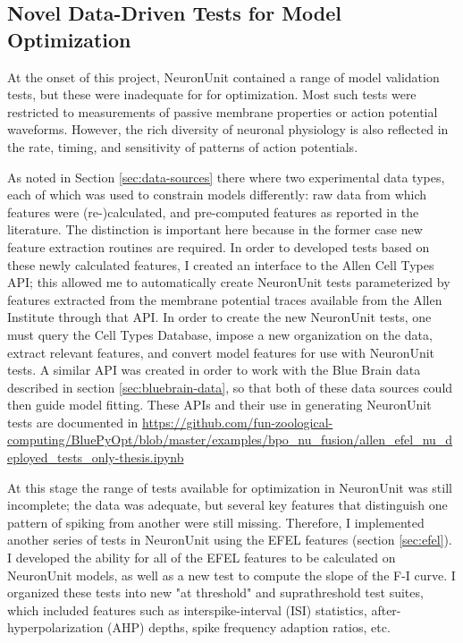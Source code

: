 \subsection{Novel Data-Driven Tests for Model Optimization}
At the onset of this project, NeuronUnit contained a range of model validation tests, but these were inadequate for for optimization.
Most such tests were restricted to measurements of passive membrane properties or action potential waveforms.
However, the rich diversity of neuronal physiology is also reflected in the rate, timing, and sensitivity of patterns of action potentials.

As noted in Section \ref{sec:data-sources} there where two experimental data types, each of which was used to constrain models differently: raw data from which features were (re-)calculated, and pre-computed features as reported in the literature.
The distinction is important here because in the former case new feature extraction routines are required.
In order to developed tests based on these newly calculated features, I created an interface to the Allen Cell Types API; this allowed me to automatically create NeuronUnit tests parameterized by features extracted from the membrane potential traces available from the Allen Institute through that API.
In order to create the new NeuronUnit tests, one must query the Cell Types Database, impose a new organization on the data, extract relevant features, and convert model features for use with NeuronUnit tests.
A similar API was created in order to work with the Blue Brain data described in section \ref{sec:bluebrain-data}, so that both of these data sources could then guide model fitting.
These APIs and their use in generating NeuronUnit tests are documented in \url{https://github.com/fun-zoological-computing/BluePyOpt/blob/master/examples/bpo_nu_fusion/allen_efel_nu_deployed_tests_only-thesis.ipynb}

At this stage the range of tests available for optimization in NeuronUnit was still incomplete; the data was adequate, but several key features that distinguish one pattern of spiking from another were still missing. Therefore, I implemented another series of tests in NeuronUnit using the EFEL features (section \ref{sec:efel}).
I developed the ability for all of the EFEL features to be calculated on NeuronUnit models, as well as a new test to compute the slope of the F-I curve.
I organized these tests into new "at threshold" and suprathreshold test suites, which included features such as
interspike-interval (ISI) statistics, after-hyperpolarization (AHP) depths, spike frequency adaption ratios, etc.


